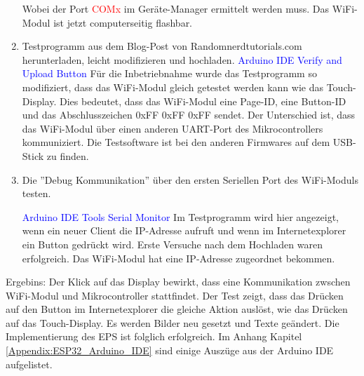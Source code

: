 \begin{enumerate}
Wobei der Port \textcolor{red}{COMx} im Geräte-Manager ermittelt werden muss. Das WiFi-Modul ist jetzt computerseitig flashbar.\newpage

\item Testprogramm aus dem Blog-Post von Randomnerdtutorials.com herunterladen, leicht modifizieren und hochladen. \cite{santos_esp32_2018}\newline
\textcolor{blue}{Arduino IDE \textrightarrow Verify and Upload Button} \newline
Für die Inbetriebnahme wurde das Testprogramm so modifiziert, dass das WiFi-Modul gleich getestet werden kann wie das Touch-Display. Dies bedeutet, dass das WiFi-Modul eine Page-ID, eine Button-ID und das Abschlusszeichen 0xFF 0xFF 0xFF sendet. Der Unterschied ist, dass das WiFi-Modul über einen anderen UART-Port des Mikrocontrollers kommuniziert. Die Testsoftware ist bei den anderen Firmwares auf dem USB-Stick zu finden.\newline

\item Die ''Debug Kommunikation'' über den ersten Seriellen Port des WiFi-Moduls testen.

\textcolor{blue}{Arduino IDE \textrightarrow Tools \textrightarrow Serial Monitor}\newline
Im Testprogramm wird hier angezeigt, wenn ein neuer Client die IP-Adresse aufruft und wenn im Internetexplorer ein Button gedrückt wird. Erste Versuche nach dem Hochladen waren erfolgreich. Das WiFi-Modul hat eine IP-Adresse zugeordnet bekommen.
\end{enumerate}

Ergebins: Der Klick auf das Display bewirkt, dass eine Kommunikation zwschen WiFi-Modul und Mikrocontroller stattfindet. Der Test zeigt, dass das Drücken auf den Button im Internetexplorer die gleiche Aktion auslöst, wie das Drücken auf das Touch-Display. Es werden Bilder neu gesetzt und Texte geändert. Die Implementierung des EPS ist folglich erfolgreich. Im Anhang Kapitel \ref{Appendix:ESP32_Arduino_IDE} sind einige Auszüge aus der Arduino IDE aufgelistet.